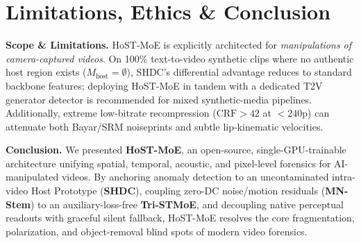 \documentclass[10pt,twocolumn]{article}
\begin{document}
\section{Limitations, Ethics \& Conclusion}
\label{sec:conclusion}

\noindent\textbf{Scope \& Limitations.} HoST-MoE is explicitly architected for \emph{manipulations of camera-captured videos}. On 100\% text-to-video synthetic clips where no authentic host region exists ($M_{\text{host}}=\emptyset$), SHDC's differential advantage reduces to standard backbone features; deploying HoST-MoE in tandem with a dedicated T2V generator detector is recommended for mixed synthetic-media pipelines. Additionally, extreme low-bitrate recompression ($\text{CRF} > 42$ at $<240$p) can attenuate both Bayar/SRM noiseprints and subtle lip-kinematic velocities.

\noindent\textbf{Conclusion.} We presented \textbf{HoST-MoE}, an open-source, single-GPU-trainable architecture unifying spatial, temporal, acoustic, and pixel-level forensics for AI-manipulated videos. By anchoring anomaly detection to an uncontaminated intra-video Host Prototype (\textbf{SHDC}), coupling zero-DC noise/motion residuals (\textbf{MN-Stem}) to an auxiliary-loss-free \textbf{Tri-STMoE}, and decoupling native perceptual readouts with graceful silent fallback, HoST-MoE resolves the core fragmentation, polarization, and object-removal blind spots of modern video forensics.

{\small


}
\end{document}
